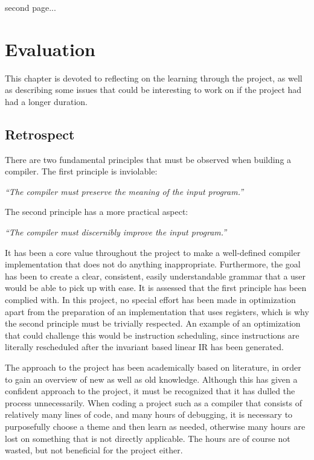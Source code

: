 \newpage

second page...


\chapter{Evaluation}
This chapter is devoted to reflecting on the learning through the project, as well as describing some issues that could be interesting to work on if the project had had a longer duration.

\section{Retrospect}
There are two fundamental principles that must be observed when building a compiler. The first principle is inviolable:

\begin{displayquote}
    \textit{``The compiler must preserve the meaning of the input program.''}
\end{displayquote}
\hspace*{}

The second principle has a more practical aspect:

\begin{displayquote}
    \textit{``The compiler must discernibly improve the input program.''}
\end{displayquote}
\hspace*{}

It has been a core value throughout the project to make a well-defined compiler implementation that does not do anything inappropriate. Furthermore, the goal has been to create a clear, consistent, easily understandable grammar that a user would be able to pick up with ease. It is assessed that the first principle has been complied with. In this project, no special effort has been made in optimization apart from the preparation of an implementation that uses registers, which is why the second principle must be trivially respected. An example of an optimization that could challenge this would be instruction scheduling, since instructions are literally rescheduled after the invariant based linear IR has been generated.

The approach to the project has been academically based on literature, in order to gain an overview of new as well as old knowledge. Although this has given a confident approach to the project, it must be recognized that it has dulled the process unnecessarily. When coding a project such as a compiler that consists of relatively many lines of code, and many hours of debugging, it is necessary to purposefully choose a theme and then learn as needed, otherwise many hours are lost on something that is not directly applicable. The hours are of course not wasted, but not beneficial for the project either.

